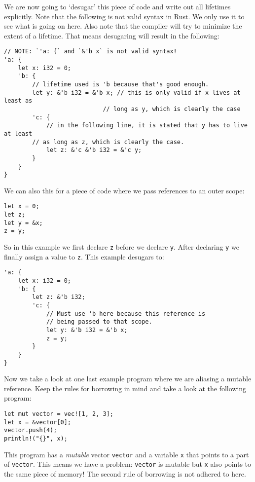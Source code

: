 We are now going to `desugar' this piece of code and write out all lifetimes explicitly. Note that the following is not valid syntax in Rust. We only use it to see what is going on here. Also note that the compiler will try to minimize the extent of a lifetime. That means desugaring will result in the following: 

\begin{verbatim}
// NOTE: `'a: {` and `&'b x` is not valid syntax!
'a: {
    let x: i32 = 0;
    'b: {
        // lifetime used is 'b because that's good enough.
        let y: &'b i32 = &'b x; // this is only valid if x lives at least as 
                            // long as y, which is clearly the case
        'c: {
            // in the following line, it is stated that y has to live at least
        // as long as z, which is clearly the case. 
            let z: &'c &'b i32 = &'c y;
        }
    }
}
\end{verbatim}

We can also this for a piece of code where we pass references to an outer scope:

\begin{verbatim}
let x = 0;
let z;
let y = &x;
z = y;
\end{verbatim}

So in this example we first declare \verb|z| before we declare \verb|y|. After declaring \verb|y| we finally assign a value to \verb|z|. This example desugars to:

\begin{verbatim}
'a: {
    let x: i32 = 0;
    'b: {
        let z: &'b i32;
        'c: {
            // Must use 'b here because this reference is
            // being passed to that scope.
            let y: &'b i32 = &'b x;
            z = y;
        }
    }
}
\end{verbatim}

Now we take a look at one last example program where we are aliasing a mutable reference. Keep the rules for borrowing in mind and take a look at the following program:

\begin{verbatim}
let mut vector = vec![1, 2, 3];
let x = &vector[0];
vector.push(4);
println!("{}", x);
\end{verbatim}

This program has a \textit{mutable} vector \texttt{vector} and a variable \texttt{x} that points to a part of \texttt{vector}. This means we have a problem:  \texttt{vector} is mutable but \texttt{x} also points to the same piece of memory! The second rule of borrowing is not adhered to here. 

